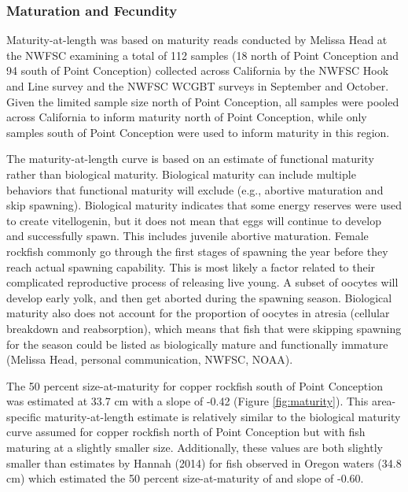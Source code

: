 \documentclass[11pt,
  english,
  letterpaper,
]{article}
\begin{document}
\hypertarget{maturation-and-fecundity}{%
\subsubsection{Maturation and Fecundity}\label{maturation-and-fecundity}}

Maturity-at-length was based on maturity reads conducted by Melissa Head at the NWFSC examining a total of 112 samples (18 north of Point Conception and 94 south of Point Conception) collected across California by the NWFSC Hook and Line survey and the NWFSC WCGBT surveys in September and October. Given the limited sample size north of Point Conception, all samples were pooled across California to inform maturity north of Point Conception, while only samples south of Point Conception were used to inform maturity in this region.

The maturity-at-length curve is based on an estimate of functional maturity rather than biological maturity. Biological maturity can include multiple behaviors that functional maturity will exclude (e.g., abortive maturation and skip spawning). Biological maturity indicates that some energy reserves were used to create vitellogenin, but it does not mean that eggs will continue to develop and successfully spawn. This includes juvenile abortive maturation. Female rockfish commonly go through the first stages of spawning the year before they reach actual spawning capability. This is most likely a factor related to their complicated reproductive process of releasing live young. A subset of oocytes will develop early yolk, and then get aborted during the spawning season. Biological maturity also does not account for the proportion of oocytes in atresia (cellular breakdown and reabsorption), which means that fish that were skipping spawning for the season could be listed as biologically mature and functionally immature (Melissa Head, personal communication, NWFSC, NOAA).

The 50 percent size-at-maturity for copper rockfish south of Point Conception was estimated at 33.7 cm with a slope of -0.42 (Figure \ref{fig:maturity}). This area-specific maturity-at-length estimate is relatively similar to the biological maturity curve assumed for copper rockfish north of Point Conception but with fish maturing at a slightly smaller size. Additionally, these values are both slightly smaller than estimates by Hannah (2014) for fish observed in Oregon waters (34.8 cm) which estimated the 50 percent size-at-maturity of and slope of -0.60.
\end{document}

